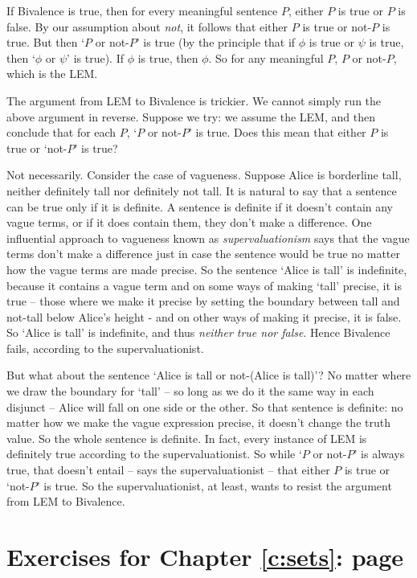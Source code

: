 {\begin{enumerate}
If Bivalence is true, then for every meaningful sentence $P$, either $P$ is true or $P$ is false. By our assumption about \emph{not}, it follows that either $P$ is true or not-$P$ is true. But then `$P$ or not-$P$' is true (by the principle that if $\phi$ is true or $\psi$ is true, then `$\phi$ or $\psi$' is true). If $\phi$ is true, then $\phi$. So for any meaningful $P$, $P$ or not-$P$, which is the LEM.

The argument from LEM to Bivalence is trickier. We cannot simply run the above argument in reverse. Suppose we try: we assume the LEM, and then conclude that for each $P$, `$P$ or not-$P$' is true. Does this mean that either $P$ is true or `not-$P$' is true? 

Not necessarily. Consider the case of vagueness. Suppose Alice is borderline tall, neither definitely tall nor definitely not tall. It is natural to say that a sentence can be true only if it is definite. A sentence is definite if it doesn't contain any vague terms, or if it does contain them, they don't make a difference. One influential approach to vagueness known as \emph{supervaluationism} \citep{fine} says that the vague terms don't make a difference just in case the sentence would be true no matter how the vague terms are made precise. So the sentence `Alice is tall' is indefinite, because it contains a vague term and on some ways of making `tall' precise, it is true – those where we make it precise by setting the boundary between tall and not-tall below Alice's height - and on other ways of making it precise, it is false. So `Alice is tall' is indefinite, and thus \emph{neither true nor false}. Hence Bivalence fails, according to the supervaluationist.

But what about the sentence `Alice is tall or not-(Alice is tall)'? No matter where we draw the boundary for `tall' – so long as we do it the same way in each disjunct – Alice will fall on one side or the other. So that sentence is definite: no matter how we make the vague expression precise, it doesn't change the truth value. So the whole sentence is definite. In fact, every instance of LEM is definitely true according to the supervaluationist. So while `$P$ or not-$P$' is always true, that doesn't entail – says the supervaluationist – that either $P$ is true or `not-$P$' is true. So the supervaluationist, at least, wants to resist the argument from LEM to Bivalence.
\end{enumerate}

\section*{Exercises for Chapter \ref{c:sets}: page \pageref{ex2}} \label{ans2}

}
